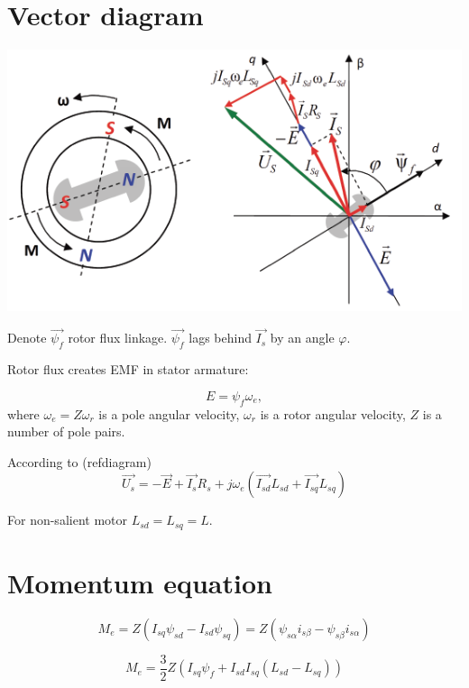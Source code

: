 \documentclass[11pt,a4paper,oneside]{report}
\begin{document}
	
\section{Vector diagram}

\begin{center}
	\includegraphics[scale=1]{motor}
\end{center}

Denote $\vec{\psi_f}$ rotor flux linkage. $\vec{\psi_f}$ lags behind $\vec{I_s}$ by an angle $\varphi$.

Rotor flux creates EMF in stator armature:

\begin{equation}
	E=\psi_f\omega_e,
\end{equation}
where $\omega_e=Z\omega_r$ is a pole angular velocity, $\omega_r$ is a rotor angular velocity, $Z$ is a number of pole pairs.

According to (ref{diagram})
\begin{equation}
	\vec{U_s} = -\vec{E}+\vec{I_s}R_s+j\omega_e(\vec{I_{sd}}L_{sd}+\vec{I_{sq}}L_{sq})
\end{equation}

For non-salient motor $L_{sd}=L_{sq}=L$.

\section{Momentum equation}

\begin{equation}
	M_e=Z(I_{sq}\psi_{sd}-I_{sd}\psi_{sq}) = Z(\psi_{s\alpha}i_{s\beta}-\psi_{s\beta}i_{s\alpha})
\end{equation}

\begin{equation}
	M_e=\frac{3}{2}Z(I_{sq}\psi_f+I_{sd}I_{sq}(L_{sd}-L_{sq}))
\end{equation}
\end{document}
